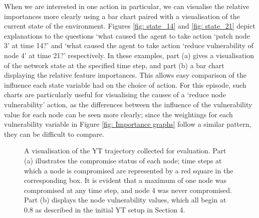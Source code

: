 \documentclass{article}
\begin{document}
When we are interested in one action in particular, we can visualise the relative importances more clearly using a bar chart paired with a visualisation of the current state of the environment. Figures \ref{fig: state_14} and \ref{fig: state_21} depict explanations to the questions `what caused the agent to take action `patch node 3' at time 14?' and `what caused the agent to take action `reduce vulnerability of node 4' at time 21?' respectively. In these examples, part (a) gives a visualisation of the network state at the specified time step, and part (b) a bar chart displaying the relative feature importances. This allows easy comparison of the influence each state variable had on the choice of action. For this episode, such charts are particularly useful for visualising the causes of a `reduce node vulnerability' action, as the differences between the influence of the vulnerability value for each node can be seen more clearly; since the weightings for each vulnerability variable in Figure \ref{fig: Importance graphs} follow a similar pattern, they can be difficult to compare. 


\begin{figure}

\centering


\centering


\label{fig: YT trajectory}
\caption{A visualisation of the YT trajectory collected for evaluation. Part (a) illustrates the compromise status of each node; time steps at which a node is compromised are represented by a red square in the corresponding box. It is evident that a maximum of one node was compromised at any time step, and node 4 was never compromised. Part (b) displays the node vulnerability values, which all begin at 0.8 as described in the initial YT setup in Section 4. }
\label{fig: YT trajectory}

\end{figure}
\end{document}
